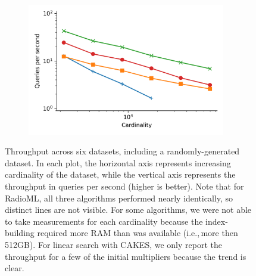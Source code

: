\begin{figure}
\begin{subfigure}[b]{0.47\textwidth}
        \includegraphics[width=0.95\textwidth]{plots/silva-SSU-Ref_PermutedBall_10_throughput.png}
        \label{fig:results:radioml-scaling}
    \end{subfigure}%
    \caption{Throughput across six datasets, including a randomly-generated dataset.
    In each plot, the horizontal axis represents increasing cardinality of the dataset, while the vertical axis represents the throughput in queries per second (higher is better).
    Note that for RadioML, all three algorithms performed nearly identically, so distinct lines are not visible.
    For some algorithms, we were not able to take measurements for each cardinality because the index-building required more RAM than was available (i.e.,\,more then 512GB).
    For linear search with CAKES, we only report the throughput for a few of the initial multipliers because the trend is clear.}
    \label{fig:results:scaling-plots}
\end{figure}


